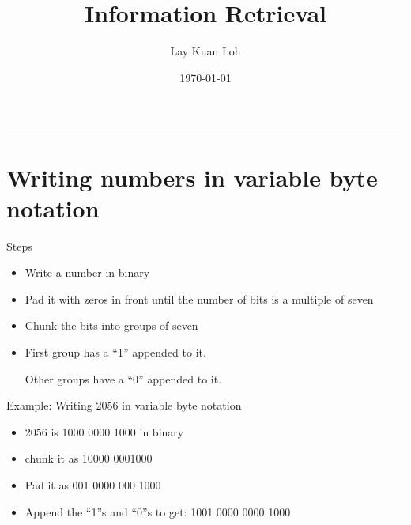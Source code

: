\documentclass[12pt]{article}
\title{Information Retrieval}
\author{Lay Kuan Loh}
\date{\today}
\begin{document}
  \maketitle

  \vspace{-0.3in}
  \rule{\linewidth}{0.4pt}



\section{Writing numbers in variable byte notation}

Steps
\begin{itemize}
  \item Write a number in binary
  \item Pad it with zeros in front until the number of bits is a multiple of seven
  \item Chunk the bits into groups of seven
  \item First group has a ``1'' appended to it.

	 Other groups have a ``0'' appended to it. 
\end{itemize}

Example: Writing 2056 in variable byte notation
\begin{itemize}
  \item 2056 is 1000 0000 1000 in binary
  \item chunk it as 10000 0001000
  \item Pad it as 001 0000 000 1000
  \item Append the ``1''s and ``0''s to get: 1001 0000 0000 1000
\end{itemize}
\end{document}

